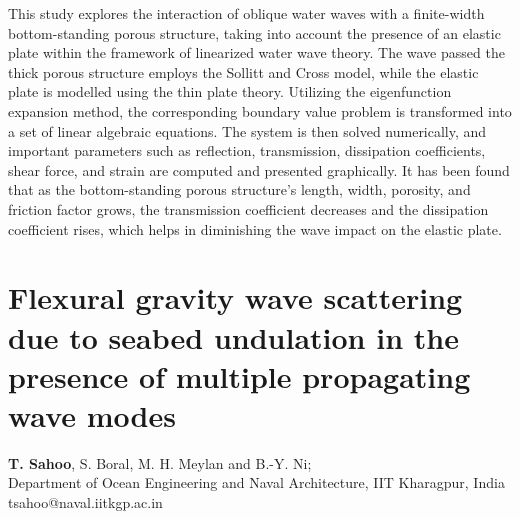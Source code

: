 \documentclass[9pt,a4paper,oneside]{book}
\numberwithin{equation}{section}
\begin{document}
This study explores the interaction of oblique water waves with a finite-width bottom-standing porous structure, taking into account the presence of an elastic plate within the framework of linearized water wave theory. The wave passed the thick porous structure employs the Sollitt and Cross model, while the elastic plate is modelled using the thin plate theory. Utilizing the eigenfunction expansion method, the corresponding boundary value
problem is transformed into a set of linear algebraic equations. The system is then solved numerically, and important parameters such as reflection, transmission, dissipation coefficients, shear force, and strain are computed and presented graphically. It has been found that as the bottom-standing porous structure’s length, width, porosity, and friction factor grows, the transmission coefficient decreases and the dissipation coefficient rises, which helps in diminishing the wave impact on the elastic plate.

\section*{Flexural gravity wave scattering due to seabed undulation in the presence of multiple propagating wave modes}
 \label{abs:22}
  {\bf T. Sahoo}, S. Boral, M. H. Meylan and B.-Y. Ni;\\
Department of Ocean Engineering and Naval Architecture, IIT Kharagpur, India\\
tsahoo@naval.iitkgp.ac.in\\
\end{document}

